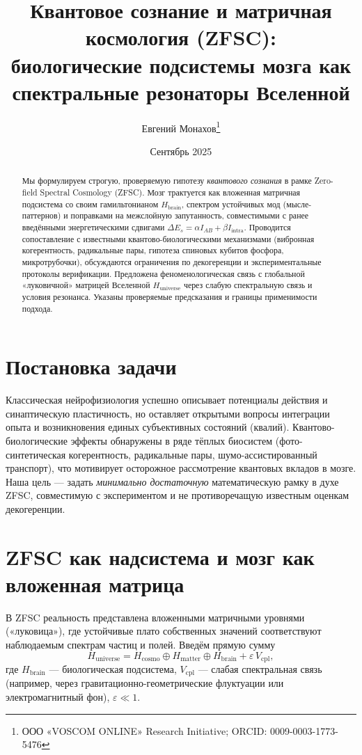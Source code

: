 \documentclass[12pt,a4paper]{article}
\title{Квантовое сознание и матричная космология (ZFSC):\\
биологические подсистемы мозга как спектральные резонаторы Вселенной}
\author{Евгений Монахов\thanks{ООО «VOSCOM ONLINE» Research Initiative; ORCID: 0009-0003-1773-5476}}
\date{Сентябрь 2025}
\begin{document}
\maketitle

\begin{abstract}
Мы формулируем строгую, проверяемую гипотезу \emph{квантового сознания} в рамке Zero-field Spectral Cosmology (ZFSC). Мозг трактуется как вложенная матричная подсистема со своим гамильтонианом $H_{\text{brain}}$, спектром устойчивых мод (мысле-паттернов) и поправками на межслойную запутанность, совместимыми с ранее введёнными энергетическими сдвигами $\Delta E_s=\alpha I_{AB}+\beta I_{\text{intra}}$. Проводится сопоставление с известными квантово-биологическими механизмами (вибронная когерентность, радикальные пары, гипотеза спиновых кубитов фосфора, микротрубочки), обсуждаются ограничения по декогеренции и экспериментальные протоколы верификации. Предложена феноменологическая связь с глобальной «луковичной» матрицей Вселенной $H_{\text{universe}}$ через слабую спектральную связь и условия резонанса. Указаны проверяемые предсказания и границы применимости подхода.
\end{abstract}

\section{Постановка задачи}
Классическая нейрофизиология успешно описывает потенциалы действия и синаптическую пластичность, но оставляет открытыми вопросы интеграции опыта и возникновения единых субъективных состояний (квалий). Квантово-биологические эффекты обнаружены в ряде тёплых биосистем (фото-синтетическая когерентность, радикальные пары, шумо-ассистированный транспорт), что мотивирует осторожное рассмотрение квантовых вкладов в мозге. Наша цель — задать \emph{минимально достаточную} математическую рамку в духе ZFSC, совместимую с экспериментом и не противоречащую известным оценкам декогеренции.

\section{ZFSC как надсистема и мозг как вложенная матрица}
В ZFSC реальность представлена вложенными матричными уровнями («луковица»), где устойчивые плато собственных значений соответствуют наблюдаемым спектрам частиц и полей. Введём прямую сумму
\begin{equation}
H_{\text{universe}} = H_{\text{cosmo}} \oplus H_{\text{matter}} \oplus H_{\text{brain}} + \varepsilon\, V_{\text{cpl}},
\end{equation}
где $H_{\text{brain}}$ — биологическая подсистема, $V_{\text{cpl}}$ — слабая спектральная связь (например, через гравитационно-геометрические флуктуации или электромагнитный фон), $\varepsilon\ll 1$.
\end{document}
